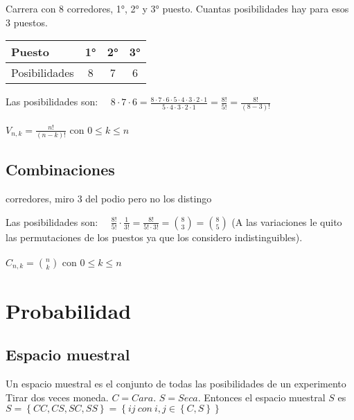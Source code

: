 \documentclass[a4paper,10pt]{article}
\begin{document}
\ejemplo Carrera con 8 corredores, 1°, 2° y 3° puesto. Cuantas posibilidades hay para esos 3 puestos.

\begin{center}
  \begin{tabular}[t]{ | l | c | c | c | }
    \hline
    Puesto & 1° & 2° & 3° \\
    \hline Posibilidades & 8 & 7 & 6 \\
    \hline
  \end{tabular}
\end{center}

Las posibilidades son: \ \ $8 \cdot 7 \cdot 6 = \frac{8 \cdot 7 \cdot 6 \cdot 5 \cdot 4 \cdot 3 \cdot 2 \cdot 1}{5 \cdot 4 \cdot 3 \cdot 2 \cdot 1} = \frac{8!}{5!} = \frac{8!}{(8-3)!}$  \\ \\

$V_{n,k} = \frac {n!} {(n-k)!} \mbox{ con } 0 \leq k \leq n$


\subsection{Combinaciones}


 corredores, miro 3 del podio pero no los distingo

Las posibilidades son: \ \ $\frac{8!}{5!} \cdot \frac{1}{3!} = \frac{8!}{5! \cdot 3!} = \binom {8}{3} = \binom {8}{5}$ (A las variaciones le quito las permutaciones de los puestos ya que los considero indistinguibles). \\ \\

$C_{n,k} = \binom {n}{k} \mbox{ con } 0 \leq k \leq n$

\section{Probabilidad}

\subsection{Espacio muestral}
Un espacio muestral es el conjunto de todas las posibilidades de un experimento \\

\ejemplo Tirar dos veces moneda. $C = Cara$. $S = Seca$. Entonces el espacio muestral $S$ es \
$S = \left\lbrace CC, CS, SC, SS \right\rbrace = \left\lbrace ij \ con \ i,j \in \left\lbrace C, S \right\rbrace \right\rbrace$ \\
\end{document}
